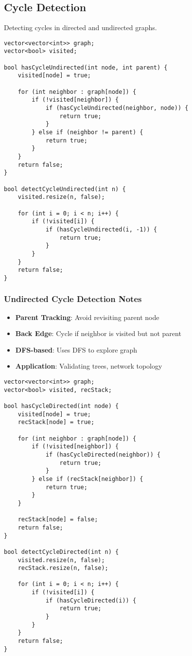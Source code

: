 \documentclass[11pt,a4paper]{article}
\begin{document}
\newpage
\subsection{Cycle Detection}
Detecting cycles in directed and undirected graphs.

\begin{lstlisting}[caption={Cycle Detection in Undirected Graph}]
vector<vector<int>> graph;
vector<bool> visited;

bool hasCycleUndirected(int node, int parent) {
    visited[node] = true;
    
    for (int neighbor : graph[node]) {
        if (!visited[neighbor]) {
            if (hasCycleUndirected(neighbor, node)) {
                return true;
            }
        } else if (neighbor != parent) {
            return true;
        }
    }
    return false;
}

bool detectCycleUndirected(int n) {
    visited.resize(n, false);
    
    for (int i = 0; i < n; i++) {
        if (!visited[i]) {
            if (hasCycleUndirected(i, -1)) {
                return true;
            }
        }
    }
    return false;
}
\end{lstlisting}

\subsubsection{Undirected Cycle Detection Notes}
\begin{itemize}
\item \textbf{Parent Tracking}: Avoid revisiting parent node
\item \textbf{Back Edge}: Cycle if neighbor is visited but not parent
\item \textbf{DFS-based}: Uses DFS to explore graph
\item \textbf{Application}: Validating trees, network topology
\end{itemize}

\newpage
\begin{lstlisting}[caption={Cycle Detection in Directed Graph}]
vector<vector<int>> graph;
vector<bool> visited, recStack;

bool hasCycleDirected(int node) {
    visited[node] = true;
    recStack[node] = true;
    
    for (int neighbor : graph[node]) {
        if (!visited[neighbor]) {
            if (hasCycleDirected(neighbor)) {
                return true;
            }
        } else if (recStack[neighbor]) {
            return true;
        }
    }
    
    recStack[node] = false;
    return false;
}

bool detectCycleDirected(int n) {
    visited.resize(n, false);
    recStack.resize(n, false);
    
    for (int i = 0; i < n; i++) {
        if (!visited[i]) {
            if (hasCycleDirected(i)) {
                return true;
            }
        }
    }
    return false;
}
\end{lstlisting}
\end{document}
